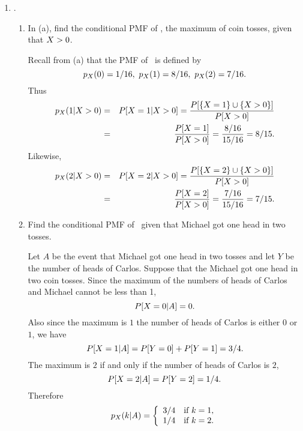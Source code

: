 


%

\usepackage{fullpage}
\usepackage{fancyhdr}

\usepackage{graphicx}

\pagestyle{fancy}

\addtolength{\headsep}{.5cm}




\renewcommand{\emph}[1]{{\it #1}}


\setlength{\headheight}{15pt}
\maketitle

\begin{enumerate}

	\item {}.
	\begin{enumerate}
		\item In  (a),
		find the conditional PMF of \X,
		the maximum of coin tosses, given that $X > 0$.
		\ifdefined\sol
		\begin{solution}
		Recall from  (a) that the PMF of \X\ is defined by
		\[
			p_{X}(0) = 1/16,\
			p_{X}(1) = 8/16,\
			p_{X}(2) = 7/16.
		\]
		Thus
		\begin{eqnarray*}
			p_{X}(1|X>0) &=& P[X=1|X>0]
			= \frac{P[\{X=1\}\cup\{X>0\}]}{P[X>0]}
			\\&=& \frac{P[X=1]}{P[X>0]}
			= \frac{8/16}{15/16} = 8/15.
		\end{eqnarray*}
		Likewise,
		\begin{eqnarray*}
			p_{X}(2|X>0) &=& P[X=2|X>0]
			= \frac{P[\{X=2\}\cup\{X>0\}]}{P[X>0]}
			\\&=& \frac{P[X=2]}{P[X>0]}
			= \frac{7/16}{15/16} = 7/15.
		\end{eqnarray*}
		\end{solution}
		\fi

		\item Find the conditional PMF of \X\ given that Michael got one head in two tosses.
		\ifdefined\sol
		\begin{solution}
			Let $A$ be the event that Michael got one head in two tosses
			and let $Y$ be the number of heads of Carlos.
			Suppose that the Michael got one head in two coin tosses.
			Since the maximum of the numbers of heads of Carlos and Michael
			cannot be less than 1,
			\[
				P[X=0|A]= 0.
			\]
			Also since the maximum is $1$ the number of heads of Carlos
			is either $0$ or $1$,
			we have
			\[
				P[X=1|A] = P[Y=0] + P[Y=1] = 3/4.
			\]
			The maximum is $2$ if and only if the number of heads of Carlos is $2$,
			\[
				P[X=2|A] = P[Y=2] = 1/4.
			\]
			Therefore
			\[
				p_{X}(k|A) = \left\{\begin{array}{ll}
					3/4	&\mbox{if }k=1,
					\\1/4	&\mbox{if }k=2.
				\end{array} \right.
			\]


\end{solution}
\end{enumerate}
\end{enumerate}
